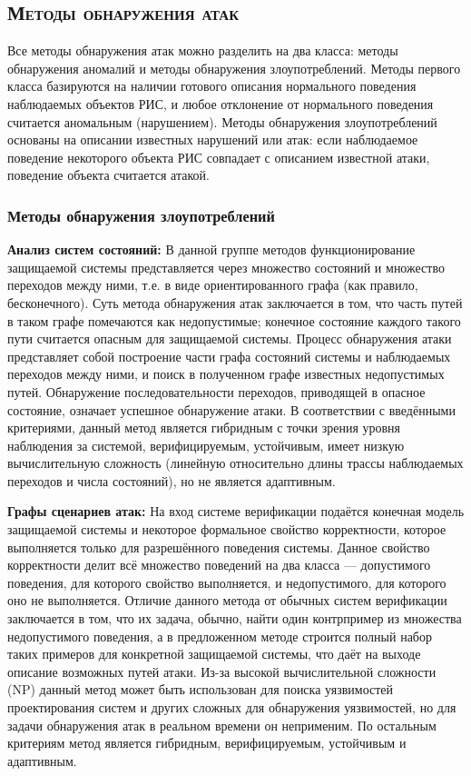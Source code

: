 \subsection{\textsc{Методы обнаружения атак}}

Все методы обнаружения атак можно разделить на два класса: методы обнаружения аномалий и методы обнаружения злоупотреблений. Методы первого класса базируются на наличии готового описания нормального поведения наблюдаемых объектов РИС, и любое отклонение от нормального поведения считается аномальным (нарушением). Методы обнаружения злоупотреблений основаны на описании известных нарушений или атак: если наблюдаемое поведение некоторого объекта РИС совпадает с описанием известной атаки, поведение объекта считается атакой.

\subsubsection{Методы обнаружения злоупотреблений}

\textbf{Анализ систем состояний:} В данной группе методов функционирование защищаемой системы представляется через множество состояний и множество переходов между ними, т.е. в виде ориентированного графа (как правило, бесконечного). Суть метода обнаружения атак заключается в том, что часть путей в таком графе помечаются как недопустимые; конечное состояние каждого такого пути считается опасным для защищаемой системы. Процесс обнаружения атаки представляет собой построение части графа состояний системы и наблюдаемых переходов между ними, и поиск в полученном графе известных недопустимых путей. Обнаружение последовательности переходов, приводящей в опасное состояние, означает успешное обнаружение атаки. В соответствии с введёнными критериями, данный метод является гибридным с точки зрения уровня наблюдения за системой, верифицируемым, устойчивым, имеет низкую вычислительную сложность (линейную относительно длины трассы наблюдаемых переходов и числа состояний), но не является адаптивным.

\textbf{Графы сценариев атак:} На вход системе верификации подаётся конечная модель защищаемой системы и некоторое формальное свойство корректности, которое выполняется только для разрешённого поведения системы. Данное свойство корректности делит всё множество поведений на два класса --- допустимого поведения, для которого свойство выполняется, и недопустимого, для которого оно не выполняется. Отличие данного метода от обычных систем верификации заключается в том, что их задача, обычно, найти один контрпример из множества недопустимого поведения, а в предложенном методе строится полный набор таких примеров для конкретной защищаемой системы, что даёт на выходе описание возможных путей атаки. Из-за высокой вычислительной сложности (NP) данный метод может быть использован для поиска уязвимостей проектирования систем и других сложных для обнаружения уязвимостей, но для задачи обнаружения атак в реальном времени он неприменим. По остальным критериям метод является гибридным, верифицируемым, устойчивым и адаптивным.


